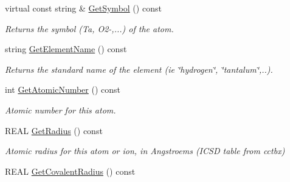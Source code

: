 \begin{DoxyCompactItemize}
\mbox{\label{class_obj_cryst_1_1_scattering_power_atom_a203ad8709ec6b88b43317a5d295e20c2}} 
virtual const string \& \mbox{\hyperlink{class_obj_cryst_1_1_scattering_power_atom_a203ad8709ec6b88b43317a5d295e20c2}{Get\+Symbol}} () const
\begin{DoxyCompactList}\small\item\em Returns the symbol (\textquotesingle{}Ta\textquotesingle{}, \textquotesingle{}O2-\/\textquotesingle{},...) of the atom. \end{DoxyCompactList}\item 
string \mbox{\hyperlink{class_obj_cryst_1_1_scattering_power_atom_a149d682bc467b524ff42c5ab69b678ba}{Get\+Element\+Name}} () const
\begin{DoxyCompactList}\small\item\em Returns the standard name of the element (ie \char`\"{}hydrogen\char`\"{}, \char`\"{}tantalum\char`\"{},..). \end{DoxyCompactList}\item 
\mbox{\label{class_obj_cryst_1_1_scattering_power_atom_ad81988ffdb47dd53db07431cbb8264c8}} 
int \mbox{\hyperlink{class_obj_cryst_1_1_scattering_power_atom_ad81988ffdb47dd53db07431cbb8264c8}{Get\+Atomic\+Number}} () const
\begin{DoxyCompactList}\small\item\em Atomic number for this atom. \end{DoxyCompactList}\item 
\mbox{\label{class_obj_cryst_1_1_scattering_power_atom_aa69db51f5b3cf24a42306bc1b4f45d4c}} 
R\+E\+AL \mbox{\hyperlink{class_obj_cryst_1_1_scattering_power_atom_aa69db51f5b3cf24a42306bc1b4f45d4c}{Get\+Radius}} () const
\begin{DoxyCompactList}\small\item\em Atomic radius for this atom or ion, in Angstroems (I\+C\+SD table from cctbx) \end{DoxyCompactList}\item 
\mbox{\label{class_obj_cryst_1_1_scattering_power_atom_a39c73f9c8d433bf5a177c14d54e00bca}} 
R\+E\+AL \mbox{\hyperlink{class_obj_cryst_1_1_scattering_power_atom_a39c73f9c8d433bf5a177c14d54e00bca}{Get\+Covalent\+Radius}} () const

\end{DoxyCompactItemize}
